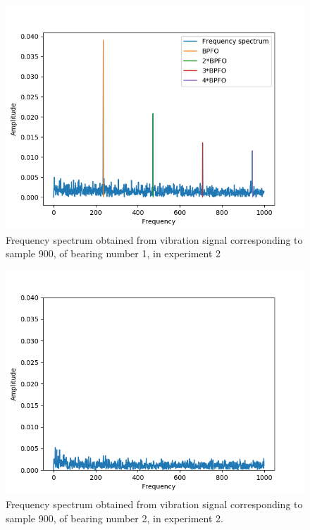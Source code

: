 \documentclass[../Main/thesis.tex]{subfiles}
\begin{document}
\begin{figure}[H] 
   \centering
   \includegraphics[width=6in]{../fig/experiment2_bearing1_fft.png} 
   \caption{Frequency spectrum obtained from vibration signal corresponding to sample 900, of bearing number 1,  in  experiment 2}
   \label{fig:bearing1-experiment2-fft}
\end{figure}

\begin{figure}[H] 
   \centering
   \includegraphics[width=6in]{../fig/experiment2_bearing2_fft.png} 
   \caption{Frequency spectrum obtained from vibration signal corresponding to sample 900, of bearing number 2, in experiment 2.}
   \label{fig:bearing2-experiment2-fft}
\end{figure}
\end{document}
